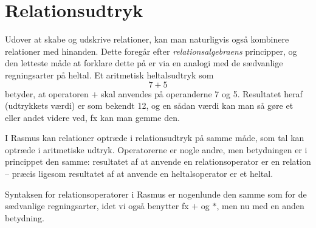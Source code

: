 
\newpage
\section{Relationsudtryk}
Udover at skabe og udskrive relationer, kan man naturligvis ogs\aa{}
kombinere relationer med hinanden. Dette foreg\aa{}r efter
{\em relationsalgebraens\/}
principper, og den letteste m\aa{}de at forklare
dette p\aa{} er via en analogi med de s\ae{}dvanlige regningsarter
p\aa{} heltal. Et aritmetisk heltalsudtryk som
$$7+5$$
betyder, at operatoren $+$ skal anvendes p\aa{} operanderne 7 og 5.
Resultatet heraf (udtrykkets v\ae{}rdi) er som bekendt 12, og en s\aa{}dan
v\ae{}rdi kan man s\aa{} g\o{}re et eller andet videre ved, fx kan man
gemme den.

I {\sc Rasmus} kan relationer optr\ae{}de i relationsudtryk p\aa{} samme
m\aa{}de, som tal kan optr\ae{}de i aritmetiske udtryk. Operatorerne er
nogle andre, men betydningen er i princippet den samme: resultatet af 
at anvende en
relationsoperator er en relation -- pr\ae{}cis ligesom resultatet af
at anvende en heltalsoperator er et heltal. 

Syntaksen for relationsoperatorer i {\sc Rasmus} er nogenlunde den samme
som for de s\ae{}dvanlige regningsarter, idet vi ogs\aa{} benytter
fx $+$ og $*$, men nu med en anden betydning.

